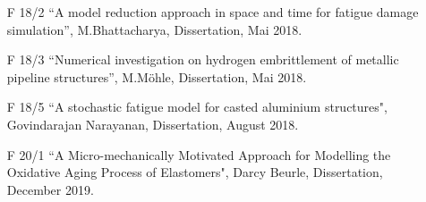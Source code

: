 \begin{itemize}
    \item[F 18/2] ``A model reduction approach in space and time for fatigue damage simulation”, M.Bhattacharya, Dissertation, Mai 2018.
    \item[F 18/3] ``Numerical investigation on hydrogen embrittlement of metallic pipeline structures”, M.Möhle, Dissertation, Mai 2018.
    \item[F 18/5] ``A stochastic fatigue model for casted aluminium structures", Govindarajan Narayanan, Dissertation, August 2018.
    \item[F 20/1] ``A Micro-mechanically Motivated Approach for Modelling the Oxidative Aging Process of Elastomers", Darcy Beurle, Dissertation, December 2019.
\end{itemize}
